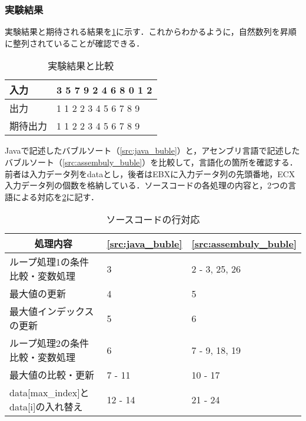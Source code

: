 \subsubsection{実験結果}
実験結果と期待される結果を\ref{tbl:execute}に示す．これからわかるように，自然数列を昇順に整列されていることが確認できる．\par
\begin{table}[h]
    \centering
    \caption{実験結果と比較}
    \label{tbl:execute}
    \begin{tabular}{l|l}
        入力   & {\ttfamily 1 3 5 7 9 2 4 6 8 0 1 2} \\
        \hline
        出力   & {\ttfamily 0 1 1 2 2 3 4 5 6 7 8 9} \\
        期待出力 & {\ttfamily 0 1 1 2 2 3 4 5 6 7 8 9}
    \end{tabular}
\end{table}
{\ttfamily Java}で記述したバブルソート（\ref{src:java_buble}）と，アセンブリ言語で記述したバブルソート（\ref{src:assembuly_buble}）を比較して，言語化の箇所を確認する．前者は入力データ列を{\ttfamily data}とし，後者は{\ttfamily EBX}に入力データ列の先頭番地，{\ttfamily ECX}入力データ列の個数を格納している．ソースコードの各処理の内容と，2つの言語による対応を\ref{tbl:ソースコードの行対応}に記す．
\begin{table}
    \centering
    \caption{ソースコードの行対応}
    \label{tbl:ソースコードの行対応}
    \begin{tabular}{p{10cm}p{2cm}p{2cm}}
        \multicolumn{1}{c}{処理内容}                              & \multicolumn{1}{c}{\ref{src:java_buble}} & \multicolumn{1}{c}{\ref{src:assembuly_buble}} \\
        \hline
        ループ処理1の条件比較・変数処理                                      & 3                                        & 2 - 3, 25, 26                                 \\
        最大値の更新                                                & 4                                        & 5                                             \\
        最大値インデックスの更新                                          & 5                                        & 6                                             \\
        ループ処理2の条件比較・変数処理                                      & 6                                        & 7 - 9, 18, 19                                 \\
        最大値の比較・更新                                             & 7 - 11                                   & 10 - 17                                       \\
        {\ttfamily data[max\_index]}と{\ttfamily data[i]}の入れ替え & 12 - 14                                  & 21 - 24                                       \\
        \hline
    \end{tabular}
\end{table}\\
